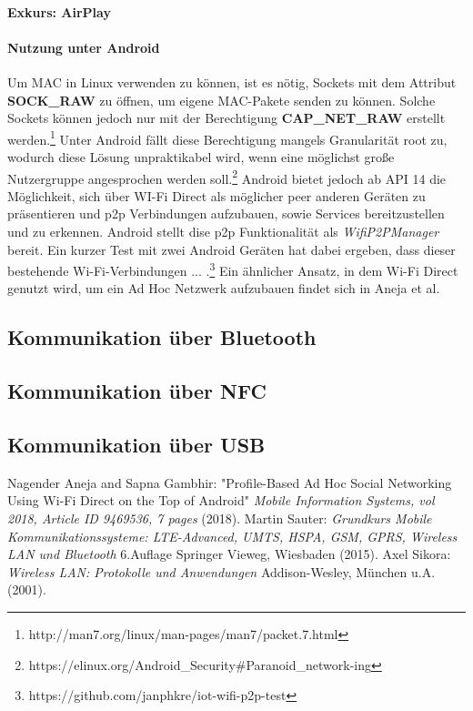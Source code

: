\documentclass[12pt,a4paper]{article}
\begin{document}
        \paragraph{Exkurs: AirPlay}

        
        \paragraph{Nutzung unter Android}
        Um MAC in Linux verwenden zu können, ist es nötig, Sockets mit dem Attribut {\bf SOCK\_RAW} zu öffnen,
        um eigene MAC-Pakete senden zu können. Solche Sockets können jedoch nur mit der Berechtigung {\bf CAP\_NET\_RAW} erstellt werden.\footnote{http://man7.org/linux/man-pages/man7/packet.7.html}
        Unter Android fällt diese Berechtigung mangels Granularität root zu, wodurch diese Lösung unpraktikabel wird,
        wenn eine möglichst große Nutzergruppe angesprochen werden soll.\footnote{https://elinux.org/Android\_Security\#Paranoid\_network-ing}
        Android bietet jedoch ab API 14 die Möglichkeit, sich über WI-Fi Direct als möglicher peer anderen Geräten zu präsentieren und
        p2p Verbindungen aufzubauen, sowie Services bereitzustellen und zu erkennen.
        Android stellt dise p2p Funktionalität als {\it WifiP2PManager} bereit. Ein kurzer Test mit zwei Android Geräten hat dabei ergeben,
        dass dieser bestehende Wi-Fi-Verbindungen ... .\footnote{https://github.com/janphkre/iot-wifi-p2p-test}
        Ein ähnlicher Ansatz, in dem Wi-Fi Direct genutzt wird, um ein Ad Hoc Netzwerk aufzubauen findet sich in Aneja et al.

        \subsection{Kommunikation über Bluetooth}

        \subsection{Kommunikation über NFC}

        \subsection{Kommunikation über USB}
    \pagebreak
    \begin{thebibliography}{10}
        Nagender Aneja and Sapna Gambhir: "Profile-Based Ad Hoc Social Networking Using Wi-Fi Direct on the Top of Android" {\it Mobile Information Systems, vol 2018, Article ID 9469536, 7 pages} (2018).
        Martin Sauter: {\it Grundkurs Mobile Kommunikationssysteme: LTE-Advanced, UMTS, HSPA, GSM, GPRS, Wireless LAN und Bluetooth} 6.Auflage Springer Vieweg, Wiesbaden (2015).
        Axel Sikora: {\it Wireless LAN: Protokolle und Anwendungen} Addison-Wesley, München u.A. (2001).
    \end{thebibliography}
\end{document}
